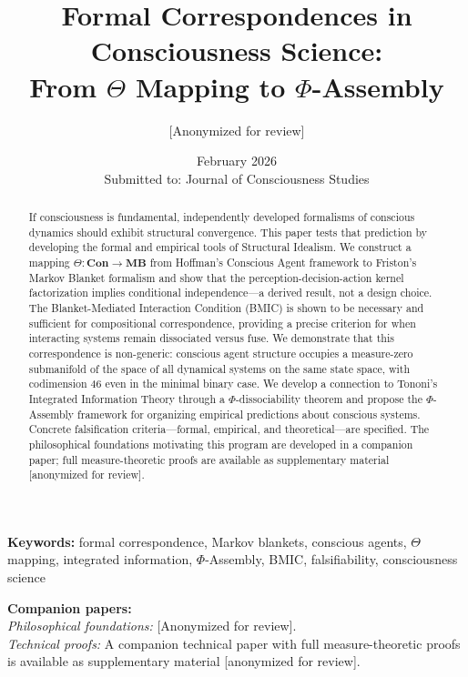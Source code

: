 \documentclass[11pt,a4paper]{article}
\theoremstyle{definition}
\theoremstyle{plain}
\theoremstyle{remark}
\newcommand{\Con}{\mathbf{Con}}
\newcommand{\MB}{\mathbf{MB}}
\begin{document}
\title{\textbf{Formal Correspondences in Consciousness Science:\\From $\Theta$ Mapping to $\Phi$-Assembly}}

\author{[Anonymized for review]}

\date{February 2026\\[1em]
\small Submitted to: Journal of Consciousness Studies}

\maketitle

\begin{abstract}
If consciousness is fundamental, independently developed formalisms of conscious dynamics should exhibit structural convergence. This paper tests that prediction by developing the formal and empirical tools of Structural Idealism. We construct a mapping $\Theta: \Con \to \MB$ from Hoffman's Conscious Agent framework to Friston's Markov Blanket formalism and show that the perception-decision-action kernel factorization implies conditional independence---a derived result, not a design choice. The Blanket-Mediated Interaction Condition (BMIC) is shown to be necessary and sufficient for compositional correspondence, providing a precise criterion for when interacting systems remain dissociated versus fuse. We demonstrate that this correspondence is non-generic: conscious agent structure occupies a measure-zero submanifold of the space of all dynamical systems on the same state space, with codimension 46 even in the minimal binary case. We develop a connection to Tononi's Integrated Information Theory through a $\Phi$-dissociability theorem and propose the $\Phi$-Assembly framework for organizing empirical predictions about conscious systems. Concrete falsification criteria---formal, empirical, and theoretical---are specified. The philosophical foundations motivating this program are developed in a companion paper; full measure-theoretic proofs are available as supplementary material [anonymized for review].
\end{abstract}

\noindent\textbf{Keywords:} formal correspondence, Markov blankets, conscious agents, $\Theta$ mapping, integrated information, $\Phi$-Assembly, BMIC, falsifiability, consciousness science

\vspace{1em}
\noindent\textbf{Companion papers:}\\
\textit{Philosophical foundations:} [Anonymized for review].\\
\textit{Technical proofs:} A companion technical paper with full measure-theoretic proofs is available as supplementary material [anonymized for review].
\end{document}
